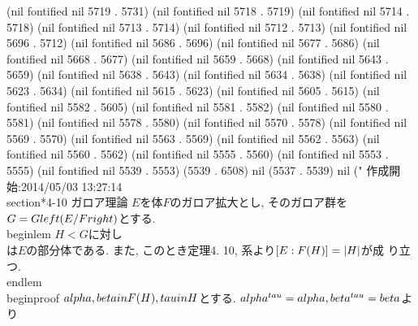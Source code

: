 {(nil fontified nil 5719 . 5731) (nil fontified nil 5718 . 5719) (nil fontified nil 5714 . 5718) (nil fontified nil 5713 . 5714) (nil fontified nil 5712 . 5713) (nil fontified nil 5696 . 5712) (nil fontified nil 5686 . 5696) (nil fontified nil 5677 . 5686) (nil fontified nil 5668 . 5677) (nil fontified nil 5659 . 5668) (nil fontified nil 5643 . 5659) (nil fontified nil 5638 . 5643) (nil fontified nil 5634 . 5638) (nil fontified nil 5623 . 5634) (nil fontified nil 5615 . 5623) (nil fontified nil 5605 . 5615) (nil fontified nil 5582 . 5605) (nil fontified nil 5581 . 5582) (nil fontified nil 5580 . 5581) (nil fontified nil 5578 . 5580) (nil fontified nil 5570 . 5578) (nil fontified nil 5569 . 5570) (nil fontified nil 5563 . 5569) (nil fontified nil 5562 . 5563) (nil fontified nil 5560 . 5562) (nil fontified nil 5555 . 5560) (nil fontified nil 5553 . 5555) (nil fontified nil 5539 . 5553) (5539 . 6508) nil (5537 . 5539) nil (" 作成開始:2014/05/03 13:27:14
\\section*{4-10 ガロア理論}
$E$を体$F$のガロア拡大とし, そのガロア群を$G=G\\left(E/F\\right)$とする.
\\begin{lem}
 $H<G$に対し
 \\[
  \\F(H)=\\{\\alpha\\in E\\mid \\fora \\tau\\in H;\\alpha^{\\tau}=\\alpha\\}
 \\]
 は$E$の部分体である. また, このとき定理4. 10, 系より$[E:\\F(H)]=|H|$が成
 り立つ. 
\\end{lem}
\\begin{proof}
 $\\alpha, \\beta\\in \\F(H), \\tau\\in H$とする. $\\alpha^{\\tau}=\\alpha,
 \\beta^{\\tau}=\\beta$より
}
